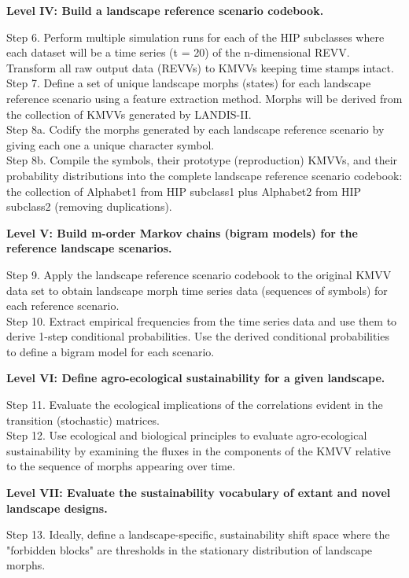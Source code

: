 \documentclass[noback]{psuposter}
\begin{document}
\textbf{Level IV: Build a landscape reference scenario codebook.}
\begin{adjustwidth}{1cm}{}
{\small Step 6. Perform multiple simulation runs for each of the HIP subclasses where each dataset will be a time series (t = 20) of the n-dimensional REVV. Transform all raw output data (REVVs) to KMVVs keeping time stamps intact.\\
Step 7. Define a set of unique landscape morphs (states) for each landscape reference scenario using a feature extraction method. Morphs will be derived from the collection of KMVVs generated by LANDIS-II. \\
Step 8a. Codify the morphs generated by each landscape reference scenario by giving each one a unique character symbol. \\
Step 8b. Compile the symbols, their prototype (reproduction) KMVVs, and their probability distributions into the complete landscape reference scenario codebook: the collection of Alphabet1 from HIP subclass1 plus Alphabet2 from HIP subclass2 (removing duplications).
}
\end{adjustwidth}
%
\textbf{Level V: Build m-order Markov chains (bigram models) for the reference landscape scenarios.}
\begin{adjustwidth}{1cm}{}
{\small Step 9. Apply the landscape reference scenario codebook to the original KMVV data set to obtain landscape morph time series data (sequences of symbols) for each reference scenario.\\
Step 10. Extract empirical frequencies from the time series data and use them to derive 1-step conditional probabilities. Use the derived conditional probabilities to define a bigram model for each scenario.
}
\end{adjustwidth}
%
\textbf{Level VI: Define agro-ecological sustainability for a given landscape.}
\begin{adjustwidth}{1cm}{}
{\small Step 11. Evaluate the ecological implications of the correlations evident in the transition (stochastic) matrices. \\
Step 12. Use ecological and biological principles to evaluate agro-ecological sustainability by examining the fluxes in the components of the KMVV relative to the sequence of morphs appearing over time.
}
\end{adjustwidth}
%
\textbf{Level VII: Evaluate the sustainability vocabulary of extant and novel landscape designs.}
\begin{adjustwidth}{1cm}{}
{\small Step 13. Ideally, define a landscape-specific, sustainability shift space where the "forbidden blocks" are thresholds in the stationary distribution of landscape morphs.
}
\end{adjustwidth}
\vspace{-1cm}
\end{document}
